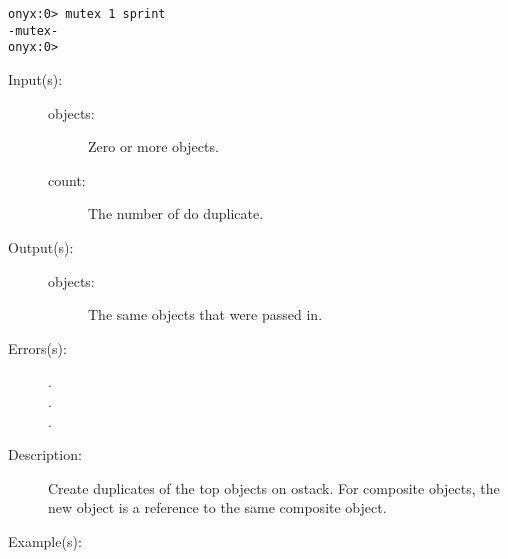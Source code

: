 \begin{description}
\begin{description}
\begin{verbatim}
onyx:0> mutex 1 sprint
-mutex-
onyx:0>
		\end{verbatim}
	\end{description}
\label{systemdict:ndup}
\item[{\onyxop{objects count}{ndup}{objects objects}}: ]
	\begin{description}\item[]
	\item[Input(s): ]
		\begin{description}\item[]
		\item[objects: ]
			Zero or more objects.
		\item[count: ]
			The number of  do duplicate.
		\end{description}
	\item[Output(s): ]
		\begin{description}\item[]
		\item[objects: ]
			The same objects that were passed in.
		\end{description}
	\item[Errors(s): ]
		\begin{description}\item[]
		\item[.]
		\item[.]
		\item[.]
		\end{description}
	\item[Description: ]
		Create duplicates of the top  objects on ostack.
		For composite objects, the new object is a reference to the same
		composite object.
	\item[Example(s): ]\begin{verbatim}


\end{verbatim}
\end{description}
\end{description}
